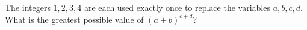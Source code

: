 The integers $1,2,3,4$ are each used exactly once to replace the variables $a,b,c,d$. What is the greatest possible value of $(a+b)^{c+d}$?

